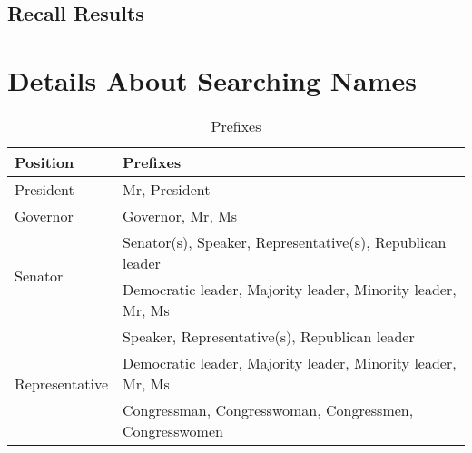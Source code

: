 \documentclass[12pt, letterpaper]{article}
\begin{document}
\subsection{Recall Results}
\label{si_recall}


\clearpage

\section{Details About Searching Names}
\label{si1}
\begin{table}[ht]
  	\caption{Prefixes}
  	\centering
  	\begin{tabular}{l l}
  	\hline
    Position &  Prefixes\\
  	\hline
      President			& Mr, President\\
      Governor			& Governor, Mr, Ms\\
      \multirow{2}{*}{Senator}	& Senator(s), Speaker,
      Representative(s), Republican leader\\
      & Democratic leader, Majority leader, Minority leader, Mr, Ms\\
      \multirow{3}{*}{Representative}& Speaker, Representative(s), Republican
      leader\\
     & Democratic leader, Majority leader, Minority leader, Mr, Ms\\
     & Congressman, Congresswoman, Congressmen, Congresswomen\\
     \hline
  	\end{tabular}
  	\label{table:taba1}
\end{table}

\clearpage
\end{document}
